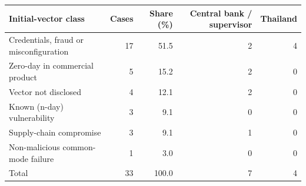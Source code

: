 \begin{tabular}{lrrrr}
\toprule
Initial-vector class & Cases & Share (\%) & Central bank / supervisor & Thailand \\
\midrule
Credentials, fraud or misconfiguration & 17 & 51.5 & 2 & 4 \\
Zero-day in commercial product & 5 & 15.2 & 2 & 0 \\
Vector not disclosed & 4 & 12.1 & 2 & 0 \\
Known (n-day) vulnerability & 3 & 9.1 & 0 & 0 \\
Supply-chain compromise & 3 & 9.1 & 1 & 0 \\
Non-malicious common-mode failure & 1 & 3.0 & 0 & 0 \\
\midrule
Total & 33 & 100.0 & 7 & 4 \\
\bottomrule
\end{tabular}